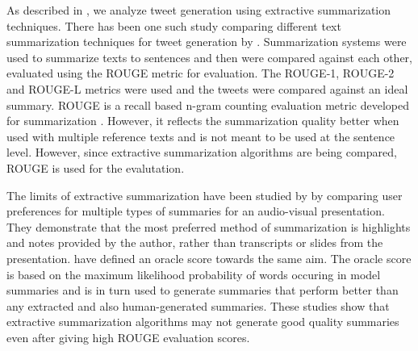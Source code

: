 As described in , we analyze tweet generation using extractive summarization techniques. There has been one such study comparing different text summarization techniques for tweet generation by  . Summarization systems were used to summarize texts to sentences and then were compared against each other, evaluated using the ROUGE metric for evaluation. The ROUGE-1, ROUGE-2 and ROUGE-L metrics were used and the tweets were compared against an ideal summary. ROUGE \cite{lin2004rouge} is a recall based n-gram counting evaluation metric developed for summarization \cite{nenkova2006summarization}. However, it reflects the summarization quality better when used with multiple reference texts and is not meant to be used at the sentence level. However, since extractive summarization algorithms are being compared, ROUGE is used for the evalutation.

The limits of extractive summarization have been studied by  by comparing user preferences for multiple types of summaries for an audio-visual presentation. They demonstrate that the most preferred method of summarization is highlights and notes provided by the author, rather than transcripts or slides from the presentation.  have defined an oracle score towards the same aim. The oracle score is based on the maximum likelihood probability of words occuring in model summaries and is in turn used to generate summaries that perform better than any extracted and also human-generated summaries. These studies show that extractive summarization algorithms may not generate good quality summaries even after giving high ROUGE evaluation scores. 


